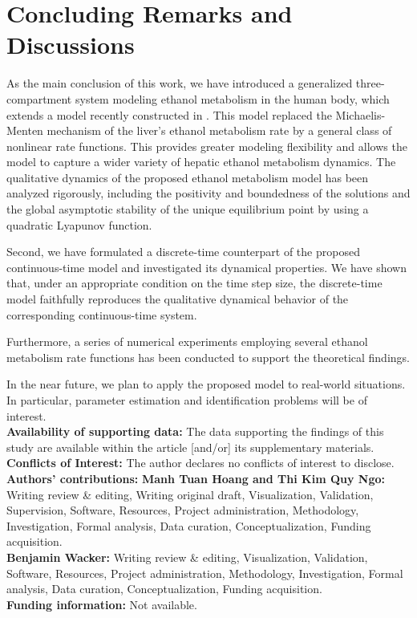 \documentclass[12pt]{article}
\theoremstyle{definition}
\theoremstyle{remark}
\numberwithin{equation}{section}
\begin{document}
\section{Concluding Remarks and Discussions}\label{Sec4}
As the main conclusion of this work, we have introduced a generalized three-compartment system modeling ethanol metabolism in the human body, which extends a model recently constructed in \cite{Wacker1}. This model replaced the Michaelis-Menten mechanism of the liver's ethanol metabolism rate by a general class of nonlinear rate functions.  This provides greater modeling flexibility and allows the model to capture a wider variety of hepatic ethanol metabolism dynamics. The qualitative dynamics of the proposed ethanol metabolism model has been analyzed rigorously, including the positivity and boundedness of the solutions and the global asymptotic stability of the unique equilibrium point by using a quadratic Lyapunov function.

Second, we have formulated a discrete-time counterpart of the proposed continuous-time model and investigated its dynamical properties. We have shown that, under an appropriate condition on the time step size, the discrete-time model faithfully reproduces the qualitative dynamical behavior of the corresponding continuous-time system.


 Furthermore, a series of numerical experiments employing several ethanol metabolism rate functions has been conducted to support the theoretical findings.

In the near future, we plan to apply the proposed model to real-world situations. In particular, parameter estimation and identification problems will be of interest.\\
\textbf{Availability of supporting data:} The data supporting the findings of this study are available within the article [and/or] its supplementary materials.\\
\textbf{Conflicts of Interest:} The author declares no conflicts of interest to disclose.\\
\textbf{Authors' contributions:} \textbf{Manh Tuan Hoang and Thi Kim Quy Ngo:} 
Writing review \& editing, Writing original draft, Visualization, Validation, Supervision, Software, Resources, Project administration, Methodology, Investigation,
Formal analysis, Data curation, Conceptualization, Funding acquisition.\\
\textbf{Benjamin Wacker:} 
Writing review \& editing, Visualization, Validation, Software, Resources, Project administration, Methodology, Investigation,
Formal analysis, Data curation, Conceptualization, Funding acquisition.\\
\textbf{Funding information:} Not available.
\end{document}
